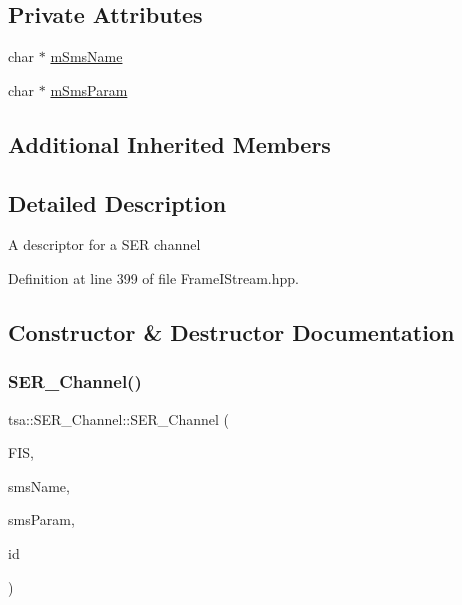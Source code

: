 \subsection*{Private Attributes}
\begin{DoxyCompactItemize}
\item 
char $\ast$ \hyperlink{classtsa_1_1_s_e_r___channel_ab132f8f0cd0652f3fb43b24d2ec9590c}{m\+Sms\+Name}
\item 
char $\ast$ \hyperlink{classtsa_1_1_s_e_r___channel_a6967202b96d336dbbef38b67724cf295}{m\+Sms\+Param}
\end{DoxyCompactItemize}
\subsection*{Additional Inherited Members}


\subsection{Detailed Description}
A descriptor for a S\+ER channel 

Definition at line 399 of file Frame\+I\+Stream.\+hpp.



\subsection{Constructor \& Destructor Documentation}
\mbox{\label{classtsa_1_1_s_e_r___channel_a9fd72d943a55cf2b6dd6f7116b188be1}} 
\subsubsection{\texorpdfstring{S\+E\+R\+\_\+\+Channel()}{SER\_Channel()}}
{\footnotesize\ttfamily tsa\+::\+S\+E\+R\+\_\+\+Channel\+::\+S\+E\+R\+\_\+\+Channel (\begin{DoxyParamCaption}\item[{\hyperlink{classtsa_1_1_frame_i_stream}{Frame\+I\+Stream} $\ast$}]{F\+IS,  }\item[{char $\ast$}]{sms\+Name,  }\item[{char $\ast$}]{sms\+Param,  }\item[{unsigned int}]{id }\end{DoxyParamCaption})}

